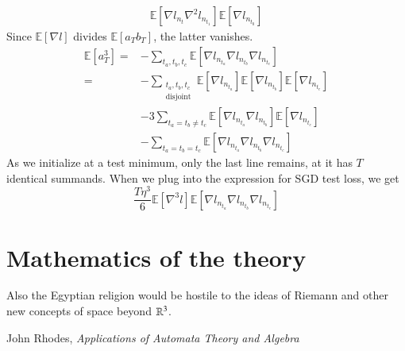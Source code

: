 \documentclass[openany, notitlepage, justified]{tufte-book}
\theoremstyle{plain}
\theoremstyle{definition}
\newcommand{\expct}[1]{\mathbb{E}\left[#1\right]}
\begin{document}
\begin{shaded}
\begin{align*}
                                \expct{\nabla l_{n_t} \nabla^2 l_{n_{t_1}}} \expct{\nabla l_{n_{t_0}}}
                \end{align*}
                Since $\expct{\nabla l}$ divides $\expct{a_T b_T}$, the latter
                vanishes.
                \begin{align*}
                    \expct{a_T^3}
                        =&- \sum_{t_a, t_b, t_c}
                                \expct{\nabla l_{n_{t_a}} \nabla l_{n_{t_b}} \nabla l_{n_{t_c}}}
                        \\
                        =&- \sum_{\substack{t_a, t_b, t_c\\ \text{disjoint}}}  
                                \expct{\nabla l_{n_{t_a}}} \expct{\nabla l_{n_{t_b}}} \expct{\nabla l_{n_{t_c}}}
                        \\&-3 \sum_{t_a=t_b\neq t_c}  
                                \expct{\nabla l_{n_{t_a}} \nabla l_{n_{t_b}}} \expct{\nabla l_{n_{t_c}}}
                        \\&-\sum_{t_a=t_b=t_c}  
                                \expct{\nabla l_{n_{t_a}} \nabla l_{n_{t_b}} \nabla l_{n_{t_c}}}
                \end{align*}
                As we initialize at a test minimum, only the last line remains, at
                it has $T$ identical summands.
                When we plug into the expression for SGD test loss, we get
                $$
                    \frac{T \eta^3 }{6}
                    \expct{\nabla^3 l}
                    \expct{\nabla l_{n_{t_a}} \nabla l_{n_{t_b}} \nabla l_{n_{t_c}}}
                $$
            \end{shaded}




\chapter{Mathematics of the theory}\label{appendix:math}

    \renewcommand{\textflush}{flushright}
    \setlength{\epigraphwidth}{0.69\columnwidth}
    \epigraph{
        Also the Egyptian religion would be hostile to the ideas of Riemann
        and other new concepts of space beyond $\mathbb{R}^3$.
    }{John Rhodes, \emph{Applications of Automata Theory and Algebra}}
\end{document}
